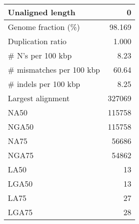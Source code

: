 \documentclass[12pt,a4paper]{article}
\begin{document}
\begin{table}[ht]
\begin{center}
\begin{tabular}{|l*{1}{|r}|}
Unaligned length & 0 \\ \hline
Genome fraction (\%) & 98.169 \\ \hline
Duplication ratio & 1.000 \\ \hline
\# N's per 100 kbp & 8.23 \\ \hline
\# mismatches per 100 kbp & 60.64 \\ \hline
\# indels per 100 kbp & 8.25 \\ \hline
Largest alignment & 327069 \\ \hline
NA50 & 115758 \\ \hline
NGA50 & 115758 \\ \hline
NA75 & 56686 \\ \hline
NGA75 & 54862 \\ \hline
LA50 & 13 \\ \hline
LGA50 & 13 \\ \hline
LA75 & 27 \\ \hline
LGA75 & 28 \\ \hline
\end{tabular}
\end{center}
\end{table}
\end{document}
